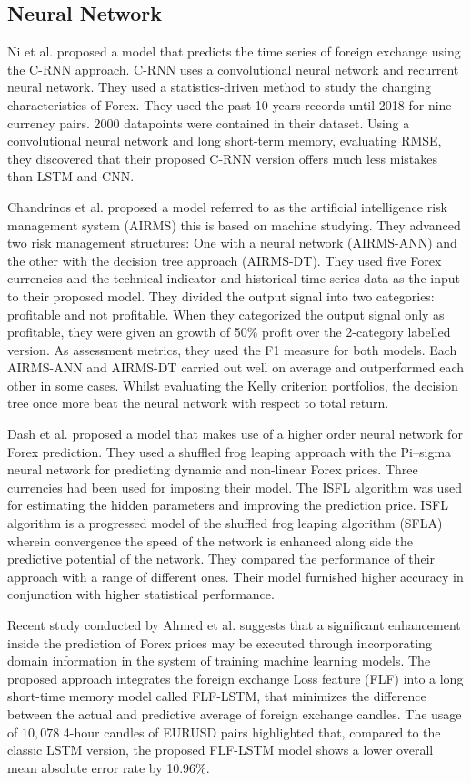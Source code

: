 \subsection{Neural Network}
Ni et al. \cite{Ni19} proposed a model that predicts the time series of foreign exchange using the C-RNN approach. C-RNN uses a convolutional neural network and recurrent neural network. They used a statistics-driven method to study the changing characteristics of Forex. They used the past 10 years records until 2018 for nine currency pairs. 2000 datapoints were contained in their dataset. Using a convolutional neural network and long short-term memory, evaluating RMSE, they discovered that their proposed C-RNN version offers much less mistakes than LSTM and CNN.

Chandrinos et al. \cite{Chandrinos18} proposed a model referred to as the artificial intelligence risk management system (AIRMS) this is based on machine studying. They advanced two risk management structures: One with a neural network (AIRMS-ANN) and the other with the decision tree approach (AIRMS-DT). They used five Forex currencies and the technical indicator and historical time-series data as the input to their proposed model. They divided the output signal into two categories: profitable and not profitable. When they categorized the output signal only as profitable, they were given an growth of 50\% profit over the 2-category labelled version. As assessment metrics, they used the F1 measure for both models. Each AIRMS-ANN and AIRMS-DT carried out well on average and outperformed each other in some cases. Whilst evaluating the Kelly criterion portfolios, the decision tree once more beat the neural network with respect to total return.

Dash et al. \cite{Dash18} proposed a model that makes use of a higher order neural network for Forex prediction. They used a shuffled frog leaping approach with the Pi–sigma neural network for predicting dynamic and non-linear Forex prices. Three currencies had been used for imposing their model. The ISFL algorithm was used for estimating the hidden parameters and improving the prediction price. ISFL algorithm is a progressed model of the shuffled frog leaping algorithm (SFLA) wherein convergence the speed of the network is enhanced along side the predictive potential of the network. They compared the performance of their approach with a range of different ones. Their model furnished higher accuracy in conjunction with higher statistical performance.

Recent study conducted by Ahmed et al. \cite{Ahmed20} suggests that a significant enhancement inside the prediction of Forex prices may be executed through incorporating domain information in the system of training machine learning models. The proposed approach integrates the foreign exchange Loss feature (FLF) into a long short-time memory model called FLF-LSTM, that minimizes the difference between the actual and predictive average of foreign exchange candles. The usage of $10,078$ 4-hour candles of EURUSD pairs highlighted that, compared to the classic LSTM version, the proposed FLF-LSTM model shows a lower overall mean absolute error rate by 10.96\%.

